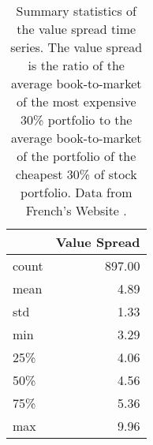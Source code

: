 \begin{table}[ht]
\centering
{%
\begin{tabular}{lr}
\toprule
 & Value Spread \\
\midrule
count & 897.00 \\
mean & 4.89 \\
std & 1.33 \\
min & 3.29 \\
25\% & 4.06 \\
50\% & 4.56 \\
75\% & 5.36 \\
max & 9.96 \\
\bottomrule
\end{tabular}
}
\caption{Summary statistics of the value spread time series. The value spread is the ratio of the average book-to-market of the most expensive 30\% portfolio to the average book-to-market of the portfolio of the cheapest 30\% of stock portfolio. Data from French's Website \citep{french_website}.}
\label{tab:value_spread_summary}
\end{table}